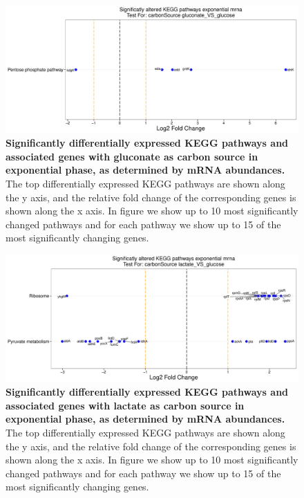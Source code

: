 \documentclass[a4paper]{article}
\begin{document}
\clearpage
\begin{figure}
	\includegraphics[width=1.0\textwidth]{../../d_figures/kegg_02.pdf}
	\caption[Significantly altered KEGG pathways for mRNA samples in exponential phase tested for  against glucose]
	{\textbf{Significantly differentially expressed KEGG pathways and associated genes with gluconate as carbon source in exponential phase, as determined by mRNA abundances.} The top differentially expressed KEGG pathways are shown along the y axis, and the relative fold change of the corresponding genes is shown along the x axis. In figure we show up to 10 most significantly changed pathways and for each pathway we show up to 15 of the most significantly changing genes.}
\end{figure}

\clearpage
\begin{figure}
	\includegraphics[width=1.0\textwidth]{../../d_figures/kegg_03.pdf}
	\caption[Significantly altered KEGG pathways for mRNA samples in exponential phase tested for lactate against glucose]
	{\textbf{Significantly differentially expressed KEGG pathways and associated genes with lactate as carbon source in exponential phase, as determined by mRNA abundances.} The top differentially expressed KEGG pathways are shown along the y axis, and the relative fold change of the corresponding genes is shown along the x axis. In figure we show up to 10 most significantly changed pathways and for each pathway we show up to 15 of the most significantly changing genes.}
\end{figure}
\end{document}
